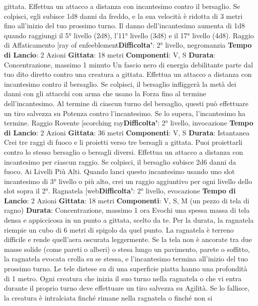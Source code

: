 \begin{multicols}{2}
gittata. Effettua un attacco a distanza con incantesimo
contro il bersaglio. Se colpisci, egli subisce 1d8 danni
da freddo, e la sua velocità è ridotta di 3 metri fino
all’inizio del tuo prossimo turno.
Il danno dell’incantesimo aumenta di 1d8 quando
raggiungi il 5° livello (2d8), l’11° livello (3d8) e il 17°
livello (4d8).
Raggio di Affaticamento
[ray of enfeeblement\textbf{Difficolta'}:
2° livello, negromanzia
\textbf{Tempo di Lancio}: 2 Azioni
\textbf{Gittata}: 18 metri
\textbf{Componenti}: V, S
\textbf{Durata}: Concentrazione, massimo 1 minuto
Un fascio nero di energia debilitante parte dal tuo dito
diretto contro una creatura a gittata. Effettua un attacco
a distanza con incantesimo contro il bersaglio. Se
colpisci, il bersaglio infliggerà la metà dei danni con gli
attacchi con arma che usano la Forza fino al termine
dell’incantesimo.
Al termine di ciascun turno del bersaglio, questi può
effettuare un tiro salvezza su Potenza contro
l’incantesimo. Se lo supera, l’incantesimo ha termine.
Raggio Rovente
[scorching ray\textbf{Difficolta'}:
2° livello, invocazione
\textbf{Tempo di Lancio}: 2 Azioni
\textbf{Gittata}: 36 metri
\textbf{Componenti}: V, S
\textbf{Durata}: Istantanea
Crei tre raggi di fuoco e li proietti verso tre bersagli a
gittata. Puoi proiettarli contro lo stesso bersaglio o
bersagli diversi.
Effettua un attacco a distanza con incantesimo per
ciascun raggio. Se colpisci, il bersaglio subisce 2d6
danni da fuoco.
Ai Livelli Più Alti. Quando lanci questo incantesimo
usando uno slot incantesimo di 3° livello o più alto, crei
un raggio aggiuntivo per ogni livello dello slot sopra il
2°.
Ragnatela
[web\textbf{Difficolta'}:
2° livello, evocazione
\textbf{Tempo di Lancio}: 2 Azioni
\textbf{Gittata}: 18 metri
\textbf{Componenti}: V, S, M (un pezzo di tela di ragno)
\textbf{Durata}: Concentrazione, massimo 1 ora
Evochi una spessa massa di tela densa e appiccicosa
in un punto a gittata, scelto da te. Per la durata, la
ragnatela riempie un cubo di 6 metri di spigolo da quel
punto. La ragnatela è terreno difficile e rende quell’aera
oscurata leggermente.
Se la tela non è ancorate tra due masse solide (come
pareti o alberi) o stesa lungo un pavimento, parete o
soffitto, la ragnatela evocata crolla su se stessa, e
l’incantesimo termina all’inizio del tuo prossimo turno.
Le tele distese su di una superficie piatta hanno una
profondità di 1 metro.
Ogni creatura che inizia il suo turno nella ragnatela o
che vi entra durante il proprio turno deve effettuare un
tiro salvezza su Agilità. Se lo fallisce, la creatura è
intralciata finché rimane nella ragnatela o finché non si

\end{multicols}
